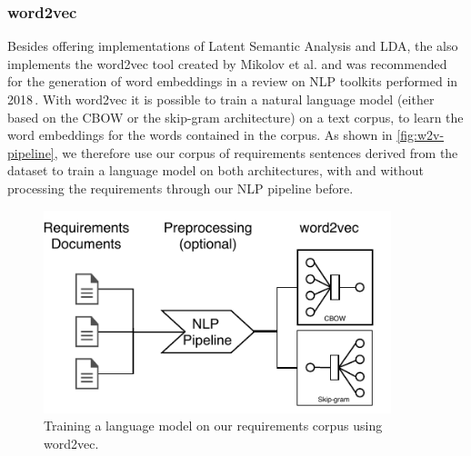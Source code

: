 \subsubsection{word2vec} %
\label{sub:own_word2vec}
Besides offering implementations of Latent Semantic Analysis and LDA, the also implements the word2vec tool created by Mikolov et al. and was recommended for the generation of word embeddings in a review on NLP toolkits performed in 2018\,\cite{solangi_review_2018}. With word2vec it is possible to train a natural language model (either based on the CBOW or the skip-gram architecture) on a text corpus, to learn the word embeddings for the words contained in the corpus. As shown in \autoref{fig:w2v-pipeline}, we therefore use our corpus of requirements sentences derived from the \crowdre{} dataset to train a language model on both architectures, with and without processing the requirements through our NLP pipeline before.
\begin{figure}[ht]
  \begin{center}
    \includegraphics[width=0.9\textwidth]{figures/word2vec_pipeline.pdf}
    \caption{Training a language model on our requirements corpus using word2vec.}
    \label{fig:w2v-pipeline}
  \end{center}
\end{figure}
\FloatBarrier

